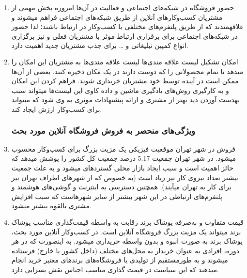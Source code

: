 \documentclass[14pt]{article}
\begin{document}
\begin{flushright}
\begin{enumerate}
\item حضور فروشگاه در شبکه‌های اجتماعی و فعالیت در آن‌ها
\newline
امروزه بخش مهمی از مشتریان کسب‌وکارهای آنلاین از طریق شبکه‌های اجتماعی فراهم میشوند و علاقهمندند که از طریق پلتفرم‌های مختلفی با کسب‌وکار در ارتباط باشند؛‌ لذا حضور در شبکه‌های اجتماعی برای برقراری ارتباط موثر با مشتریان فعلی و نیز برگزاری انواع کمپین تبلیغاتی و … برای جذب مشتریان جدید اهمیت دارد.
\item امکان تشکیل لیست علاقه مندی‌ها 
\newline
لیست علاقه مندی‌ها به مشتریان این امکان را میدهد تا تمام محصولاتی را که دوست دارند در یک مکان ذخیره کنند. بعضی از آن‌ها ممکن است در آینده توسط خود مشتریان خریداری شوند. فراهم کردن این امکان و به کارگیری روش‌های یادگیری ماشین و داده کاوی این لیست‌ها میتواند سبب بهدست آوردن دید بهتر از مشتری و ارائه پیشنهادات موثری به وی شود که میتواند برای کسب‌وکار ارزش ایجاد کند.\\


\subsubsection{ویژگی‌های منحصر به فروش فروشگاه آنلاین مورد بحث}


\item فروش در شهر تهران
\newline
موقعیت فیزیکی یک مزیت بزرگ برای کسب‌وکار محسوب میشود. در شهر تهران جمعیت 5.17 درصد جمعیت کل کشور را پوشش میدهد که حائز اهمیت است و سبب ایجاد بازار محلی گستردهای میشود و به علت جمعیت بیشتر تعداد نیروی کار نیز زیاد است (به خصوص که از شهرهای اطراف تهران نیز برای کار به تهران میآیند). همچنین دسترسی به اینترنت و گوشی‌های هوشمند و پلتفرم‌های ارتباطی در این شهر بیشتر از سایر شهرهاست که سبب افزایش مشتری بالقوه بیشتر میشود. 

\item قیمت متفاوت و به‌صرفه پوشاک برند
\newline
رقابت به واسطه قیمت‌گذاری مناسب پوشاک برند میتواند یک مزیت بزرگ فروشگاه آنلاین است. در کسب‌وکار آنلاین مورد بحث، پوشاک برند به صورت انبوه و بدون واسطه خریداری میشود. به اینصورت که در هر دوره، افرادی به عنوان خریدار به محل‌های مختلف (داخل کشور یا خارج) فرستاده میشوند و به طورمستقیم از تولیدی یا فروشگاه‌های برندهای معتبر خرید انجام میدهند که این سیاست در قیمت گذاری مناسب اجناس نقش بسزایی دارد.


\end{enumerate}
\end{flushright}
\end{document}
